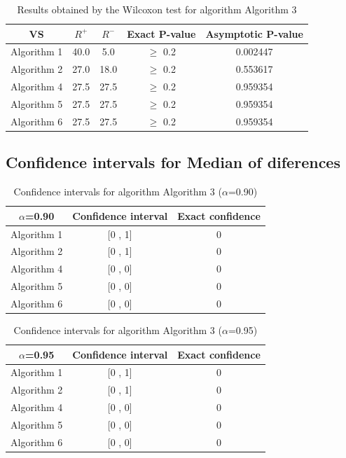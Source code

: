 \documentclass[a4paper,10pt]{article}
\begin{document}
\begin{table}[!htp]
\centering\small
\begin{tabular}{
|c|c|c|c|c|}
\hline
 VS & $R^{+}$ & $R^{-}$ & Exact P-value & Asymptotic P-value \\ \hline 
Algorithm 1 & 40.0 & 5.0 & $\geq$ 0.2 & 0.002447\\ \hline 
Algorithm 2 & 27.0 & 18.0 & $\geq$ 0.2 & 0.553617\\ \hline 
Algorithm 4 & 27.5 & 27.5 & $\geq$ 0.2 & 0.959354\\ \hline 
Algorithm 5 & 27.5 & 27.5 & $\geq$ 0.2 & 0.959354\\ \hline 
Algorithm 6 & 27.5 & 27.5 & $\geq$ 0.2 & 0.959354\\ \hline 

\end{tabular}
\caption{Results obtained by the Wilcoxon test for algorithm Algorithm 3}
\end{table}

\subsection{Confidence intervals for Median of diferences}

\begin{table}[!htp]
\centering\small
\begin{tabular}{
|c|c|c|}
\hline
 $\alpha$=0.90 & Confidence interval & Exact confidence \\ \hline 
Algorithm 1 & [0 , 1] & 0\\ \hline 
Algorithm 2 & [0 , 1] & 0\\ \hline 
Algorithm 4 & [0 , 0] & 0\\ \hline 
Algorithm 5 & [0 , 0] & 0\\ \hline 
Algorithm 6 & [0 , 0] & 0\\ \hline 

\end{tabular}
\caption{Confidence intervals for algorithm Algorithm 3 ($\alpha$=0.90)}
\end{table}
\begin{table}[!htp]
\centering\small
\begin{tabular}{
|c|c|c|}
\hline
 $\alpha$=0.95 & Confidence interval & Exact confidence \\ \hline 
Algorithm 1 & [0 , 1] & 0\\ \hline 
Algorithm 2 & [0 , 1] & 0\\ \hline 
Algorithm 4 & [0 , 0] & 0\\ \hline 
Algorithm 5 & [0 , 0] & 0\\ \hline 
Algorithm 6 & [0 , 0] & 0\\ \hline 

\end{tabular}
\caption{Confidence intervals for algorithm Algorithm 3 ($\alpha$=0.95)}
\end{table}
\end{document}
